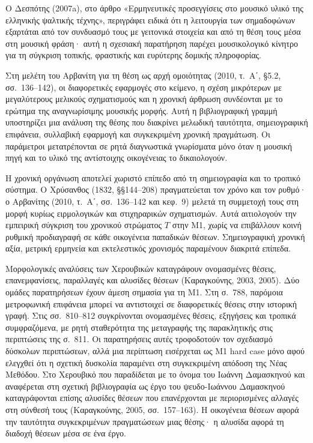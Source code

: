 \documentclass[11pt,a4paper]{article}
\begin{document}
Ο Δεσπότης (2007a), στο άρθρο «Ερμηνευτικές προσεγγίσεις στο μουσικό υλικό της ελληνικής ψαλτικής τέχνης», περιγράφει ειδικά ότι η λειτουργία των σημαδοφώνων εξαρτάται από τον συνδυασμό τους με γειτονικά στοιχεία και από τη θέση τους μέσα στη μουσική φράση· αυτή η σχεσιακή παρατήρηση παρέχει μουσικολογικό κίνητρο για τη σύγκριση τοπικής, φραστικής και ευρύτερης δομικής πληροφορίας.

Στη μελέτη του Αρβανίτη για τη θέση ως αρχή ομοιότητας (2010, τ.~Α΄, §5.2, σσ.~136--142), οι διαφορετικές εφαρμογές στο κείμενο, η σχέση μικρότερων με μεγαλύτερους μελικούς σχηματισμούς και η χρονική άρθρωση συνδέονται με το ερώτημα της αναγνωρίσιμης μουσικής μορφής. Αυτή η βιβλιογραφική γραμμή υποστηρίζει μια ανάλυση της θέσης που διακρίνει μελωδική ταυτότητα, σημειογραφική επιφάνεια, συλλαβική εφαρμογή και συγκεκριμένη χρονική πραγμάτωση. Οι παράμετροι μετατρέπονται σε ρητά διαγνωστικά γνωρίσματα μόνο όταν η μουσική πηγή και το υλικό της αντίστοιχης οικογένειας το δικαιολογούν.

Η χρονική οργάνωση αποτελεί χωριστό επίπεδο από τη σημειογραφία και το τροπικό σύστημα. Ο Χρύσανθος (1832, §§144--208) πραγματεύεται τον χρόνο και τον ρυθμό· ο Αρβανίτης (2010, τ.~Α΄, σσ.~136--142 και κεφ.~9) μελετά τη συμμετοχή τους στη μορφή κυρίως ειρμολογικών και στιχηραρικών σχηματισμών. Αυτά αιτιολογούν την εμπειρική σύγκριση του χρονικού στρώματος $T$ στην M1, χωρίς να επιβάλλουν κοινή ρυθμική προδιαγραφή σε κάθε οικογένεια παπαδικών θέσεων. Σημειογραφική χρονική αξία, μετρική ερμηνεία και εκτελεστικός χρονισμός παραμένουν διακριτά επίπεδα.

Μορφολογικές αναλύσεις των Χερουβικών καταγράφουν ονομασμένες θέσεις, επανεμφανίσεις, παραλλαγές και αλυσίδες θέσεων (Καραγκούνης, 2003, 2005). Δύο ομάδες παρατηρήσεων έχουν άμεση σημασία για τη M1. Στη σ.~788, παρόμοια μετροφωνική επιφάνεια μπορεί να αντιστοιχεί σε διαφορετικές θέσεις στην ιστορική γραφή. Στις σσ.~810--812 συγκρίνονται ονομασμένες θέσεις, εξηγήσεις και τροπικά συμφραζόμενα, με ρητή σταθερότητα της μεταγραφής της παρακλητικής στις περιπτώσεις της σ.~811. Οι παρατηρήσεις αυτές τροφοδοτούν τον σχεδιασμό δύσκολων περιπτώσεων, αλλά μια περίπτωση εισέρχεται ως M1 hard case μόνο αφού ελεγχθεί ότι η σχετική δυσκολία παραμένει στη συγκεκριμένη απόδοση της Νέας Μεθόδου. Στο Χερουβικό που παραδίδεται με το όνομα του Ιωάννη Δαμασκηνού και αναφέρεται στη σχετική βιβλιογραφία ως έργο του ψευδο-Ιωάννου Δαμασκηνού καταγράφονται επίσης αλυσίδες θέσεων που επανέρχονται με περιορισμένες αλλαγές στη σύνθεσή τους (Καραγκούνης, 2005, σσ.~157--163). Η οικογένεια θέσεων αφορά την ταυτότητα συγκεκριμένων πραγματώσεων μιας θέσης· η αλυσίδα αφορά τη διαδοχή θέσεων μέσα σε ένα έργο.
\end{document}
